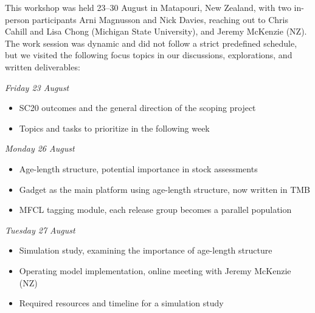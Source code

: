 \documentclass{SCreport}
\begin{document}
This workshop was held 23--30 August in Matapouri, New Zealand, with two
in-person participants Arni Magnusson and Nick Davies, reaching out to Chris
Cahill and Lisa Chong (Michigan State University), and Jeremy McKenzie (NZ). The
work session was dynamic and did not follow a strict predefined schedule, but we
visited the following focus topics in our discussions, explorations, and written
deliverables:

\vspace{1ex}

\textit{Friday 23 August}\\[-4ex]

\begin{itemize}
  \item[] SC20 outcomes and the general direction of the scoping
  project\\[-4.5ex]
  \item[] Topics and tasks to prioritize in the following week\\[-2.5ex]
\end{itemize}

\textit{Monday 26 August}\\[-4ex]

\begin{itemize}
  \item[] Age-length structure, potential importance in stock
  assessments\\[-4.5ex]
  \item[] Gadget as the main platform using age-length structure, now written in
  TMB\\[-4.5ex]
  \item[] MFCL tagging module, each release group becomes a parallel
  population\\[-2.5ex]
\end{itemize}

\textit{Tuesday 27 August}\\[-4ex]

\begin{itemize}
  \item[] Simulation study, examining the importance of age-length
  structure\\[-4.5ex]
  \item[] Operating model implementation, online meeting with Jeremy McKenzie
  (NZ)\\[-4.5ex]
  \item[] Required resources and timeline for a simulation study\\[-2.5ex]
\end{itemize}
\end{document}
